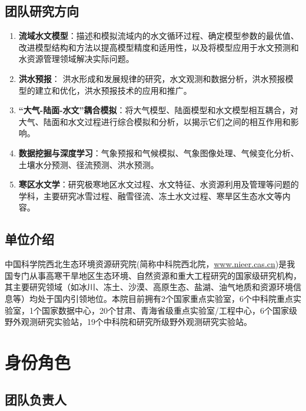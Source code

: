 \documentclass[
]{ctexbook}
\providecommand{\tightlist}{%
  \setlength{\itemsep}{0pt}\setlength{\parskip}{0pt}}
\begin{document}
\hypertarget{sec:resinst}{%
\subsection{团队研究方向}\label{sec:resinst}}

\begin{enumerate}
\def\labelenumi{\arabic{enumi}.}
\tightlist
\item
  \textbf{流域水文模型}：描述和模拟流域内的水文循环过程、确定模型参数的最优值、改进模型结构和方法以提高模型精度和适用性，以及将模型应用于水文预测和水资源管理领域解决实际问题。
\item
  \textbf{洪水预报}： 洪水形成和发展规律的研究，水文观测和数据分析，洪水预报模型的建立和优化，洪水预报技术的应用和推广。
\item
  \textbf{``大气-陆面-水文''耦合模拟}：将大气模型、陆面模型和水文模型相互耦合，对大气、陆面和水文过程进行综合模拟和分析，以揭示它们之间的相互作用和影响。
\item
  \textbf{数据挖掘与深度学习}：气象预报和气候模拟、气象图像处理、气候变化分析、土壤水分预测、径流预测、洪水预测。
\item
  \textbf{寒区水文学}：研究极寒地区水文过程、水文特征、水资源利用及管理等问题的学科，主要研究冰雪过程、融雪径流、冻土水文过程、寒旱区生态水文等内容。
\end{enumerate}

\hypertarget{ux5355ux4f4dux4ecbux7ecd}{%
\subsection{单位介绍}\label{ux5355ux4f4dux4ecbux7ecd}}

中国科学院西北生态环境资源研究院(简称中科院西北院，\href{http://www.nieer.cas.cn}{www.nieer.cas.cn})是我国专门从事高寒干旱地区生态环境、自然资源和重大工程研究的国家级研究机构，其主要研究领域（如冰川、冻土、沙漠、高原生态、盐湖、油气地质和资源环境信息等）均处于国内引领地位。本院目前拥有2个国家重点实验室，6个中科院重点实验室，1个国家数据中心，20个甘肃、青海省级重点实验室/工程中心，6个国家级野外观测研究实验站，19个中科院和研究所级野外观测研究实验站。

\hypertarget{ux8eabux4efdux89d2ux8272}{%
\section{身份角色}\label{ux8eabux4efdux89d2ux8272}}

\hypertarget{ux56e2ux961fux8d1fux8d23ux4eba}{%
\subsection{团队负责人}\label{ux56e2ux961fux8d1fux8d23ux4eba}}
\end{document}
